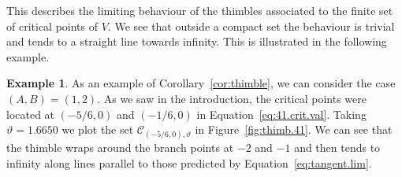 \documentclass[12pt,reqno]{amsart}
\theoremstyle{definition}
\newtheorem{example}[theorem]{Example}
\def\calC{\mathcal C}
\renewcommand{\=}{\;=\;}
\begin{document}
This describes the limiting behaviour of the thimbles associated to the finite set of critical points of $V$. We see that outside a compact set the behaviour is trivial and tends to a straight line towards infinity.
This is illustrated in the following example.
\begin{example}
As an example of Corollary~\ref{cor:thimble}, we can consider the case $(A,B)=(1,2)$. As we saw in the introduction, the critical points were located at $(-5/6,0)$ and $(-1/6,0)$ in Equation~\eqref{eq:41.crit.val}. Taking $\vartheta=1.6650$ we plot the set $\calC_{(-5/6,0),\vartheta}$ in Figure~\ref{fig:thimb.41}. We can see that the thimble wraps around the branch points at $-2$ and $-1$ and then tends to infinity along lines parallel to those predicted by Equation~\eqref{eq:tangent.lim}.
\begin{figure}[ht]
\begin{tikzpicture}[scale=2]

\end{tikzpicture}
\end{figure}
\end{example}
\end{document}
